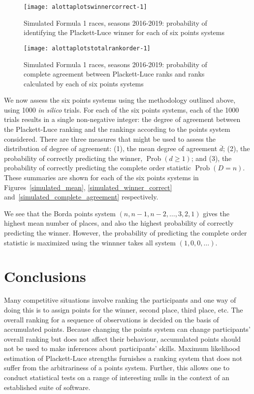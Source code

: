 \documentclass{elsarticle}
\begin{document}
\begin{figure}
{\centering \texttt{[image: alottaplotswinnercorrect-1]} }
\caption[\doublespacing Simulated Formula 1 races, seasons
  2016-2019]{\doublespacing Simulated Formula 1 races, seasons
  2016-2019: probability of identifying the Plackett-Luce winner for
  each of six points \label{simulated_winner_correct}
  systems}\label{fig:alottaplotswinnercorrect}
\end{figure}

\begin{figure}
{\centering \texttt{[image: alottaplotstotalrankorder-1]}}
\caption[\doublespacing Simulated Formula 1 races, seasons
  2016-2019]{\doublespacing Simulated Formula 1 races, seasons
  2016-2019: probability of complete agreement between Plackett-Luce
  ranks and ranks calculated by each of six
  points \label{simulated_complete_agreement}
  systems}\label{fig:alottaplotstotalrankorder}
\end{figure}

We now assess the six points systems using the methodology outlined
above, using 1000 \emph{in silico} trials.  For each of the six points
systems, each of the 1000 trials results in a single non-negative
integer: the degree of agreement between the Plackett-Luce ranking and
the rankings according to the points system considered.  There are
three measures that might be used to assess the distribution of degree
of agreement: (1), the mean degree of agreement \(\overline{d}\); (2),
the probability of correctly predicting the winner,
$\operatorname{Prob}(d\geq 1)$; and (3), the probability of correctly
predicting the complete order statistic $\operatorname{Prob}(D=n)$.
These summaries are shown for each of the six points systems in
Figures~\ref{simulated_mean}, \ref{simulated_winner_correct}
and~\ref{simulated_complete_agreement} respectively.

We see that the Borda points system $(n,n-1,n-2,\ldots,3,2,1)$ gives
the highest mean number of places, and also the highest probability of
correctly predicting the winner.  However, the probability of predicting
the complete order statistic is maximized using the winnner takes all
system \((1,0,0,\ldots)\).

\section{Conclusions}

Many competitive situations involve ranking the participants and one
way of doing this is to assign points for the winner, second place,
third place, etc.  The overall ranking for a sequence of observations
is decided on the basis of accumulated points.  Because changing the
points system can change participants' overall ranking but does not
affect their behaviour, accumulated points should not be used to make
inferences about participants' skills.  Maximum likelihood estimation
of Plackett-Luce strengths furnishes a ranking system that does not
suffer from the arbitrariness of a points system.  Further, this
allows one to conduct statistical tests on a range of interesting
nulls in the context of an established suite of software.
\end{document}
